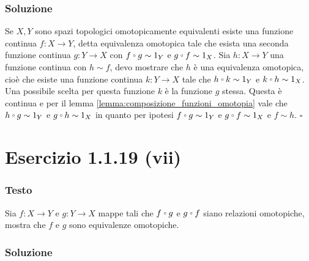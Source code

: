 \documentclass[10pt, toc=sectionentrywithdots]{scrartcl}
\let\latexcirc=\circ
\newcommand{\ccirc}{\mathbin{\mathchoice
  {\xcirc\scriptstyle}
  {\xcirc\scriptstyle}
  {\xcirc\scriptscriptstyle}
  {\xcirc\scriptscriptstyle}
}}
\newcommand{\xcirc}[1]{\vcenter{\hbox{$#1\latexcirc$}}}
\let\circ\ccirc
\begin{document}
\subsubsection*{Soluzione}

Se $ X, Y $ sono spazi topologici omotopicamente equivalenti esiste una
funzione continua $ f \colon X \to Y $, detta equivalenza omotopica tale che esista una
seconda funzione continua $ g \colon Y \to X $ con $ f \circ g \sim 1_Y $ e
$ g \circ f \sim 1_X $. Sia $ h \colon X \to Y $ una funzione continua con
$ h \sim f $, devo mostrare che $ h $ è una equivalenza omotopica, cioè che esiste una
funzione continua $ k \colon Y \to X $ tale che $ h \circ k \sim 1_Y $ e
$ k \circ h \sim 1_X $. Una possibile scelta per questa funzione $ k $ è la funzione
$ g $ stessa. Questa è continua e per il lemma
\ref{lemma:composizione_funzioni_omotopia} vale che $ h \circ g \sim 1_Y $ e
$ g \circ h \sim 1_X $ in quanto per ipotesi $ f \circ g \sim 1_Y $ e
$ g \circ f \sim 1_X $ e $ f \sim h $. \hfill $ \square $

\section[1.1.19 (vii)]{Esercizio 1.1.19 (vii)}

\subsubsection*{Testo}

Sia $ f \colon X \to Y $ e $ g \colon Y \to X $ mappe tali che $ f \circ g $ e
$ g \circ f $ siano relazioni omotopiche, mostra che $ f $ e $ g $ sono equivalenze
omotopiche.

\subsubsection*{Soluzione}
\end{document}
